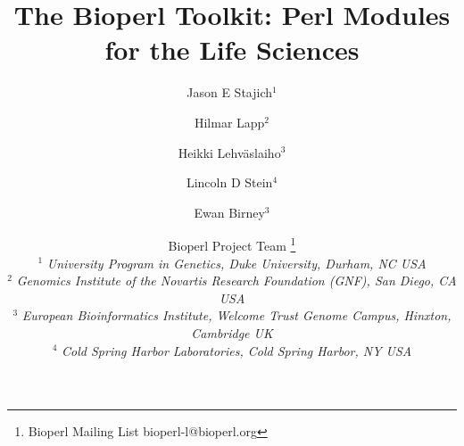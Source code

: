 \documentclass[12pt]{article}
\begin{document}
\doublespacing
\title{The Bioperl Toolkit: Perl Modules for the Life Sciences}
\author{Jason E Stajich$^1$ \and
Hilmar Lapp$^2$ \and
Heikki Lehv\"{a}slaiho$^3$ \and 
Lincoln D Stein$^4$ \and Ewan Birney$^3$ \and
Bioperl Project Team \thanks{Bioperl Mailing List bioperl-l@bioperl.org} \\
$^1$ \small{\textit{University Program in Genetics, Duke University,  Durham, NC USA}} \\
$^2$ \small{\textit{Genomics Institute of the Novartis Research
Foundation (GNF), San Diego, CA USA}} \\
$^3$ \small{\textit{European Bioinformatics Institute, Welcome Trust
Genome Campus, Hinxton, Cambridge UK}} \\
$^4$ \small{\textit{Cold Spring Harbor Laboratories, Cold Spring Harbor, NY USA }}\\
}
\maketitle
\end{document}
